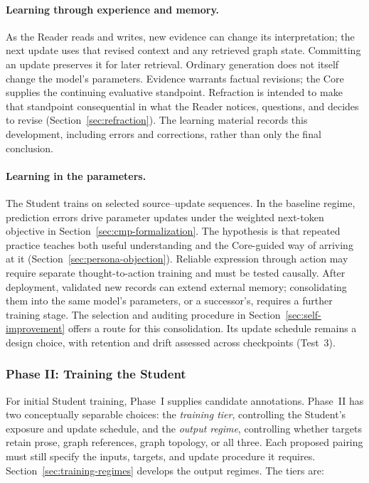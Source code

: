 \documentclass[11pt]{article}
\begin{document}
\paragraph{Learning through experience and memory.}
As the Reader reads and writes, new evidence can change its interpretation;
the next update uses that revised context and any retrieved graph state.
Committing an update preserves it for later retrieval. Ordinary generation
does not itself change the model's parameters. Evidence warrants factual
revisions; the Core supplies the continuing evaluative standpoint.
Refraction is intended to make that standpoint consequential in what the Reader notices,
questions, and decides to revise (Section~\ref{sec:refraction}). The learning
material records this development, including errors and corrections, rather
than only the final conclusion.

\paragraph{Learning in the parameters.}
The Student trains on selected source--update sequences. In the baseline
regime, prediction errors drive parameter updates under the weighted
next-token objective in Section~\ref{sec:cmp-formalization}. The hypothesis is
that repeated practice teaches both useful understanding and the Core-guided
way of arriving at it (Section~\ref{sec:persona-objection}). Reliable expression
through action may require separate thought-to-action training and must be
tested causally. After deployment, validated
new records can extend external memory; consolidating them into the same
model's parameters, or a successor's, requires a further training stage.
The selection and auditing procedure in Section~\ref{sec:self-improvement}
offers a route for this consolidation. Its update schedule remains a design
choice, with retention and drift assessed across checkpoints (Test~3).

\subsubsection{Phase II: Training the Student}\label{sec:training-phase}

For initial Student training, Phase~I supplies candidate annotations.
Phase~II has two conceptually separable
choices: the \emph{training tier}, controlling the Student's exposure and update
schedule, and the \emph{output regime}, controlling whether targets retain
prose, graph references, graph topology, or all three. Each proposed pairing
must still specify the inputs, targets, and update procedure it requires.
Section~\ref{sec:training-regimes} develops the output regimes. The tiers are:
\end{document}
